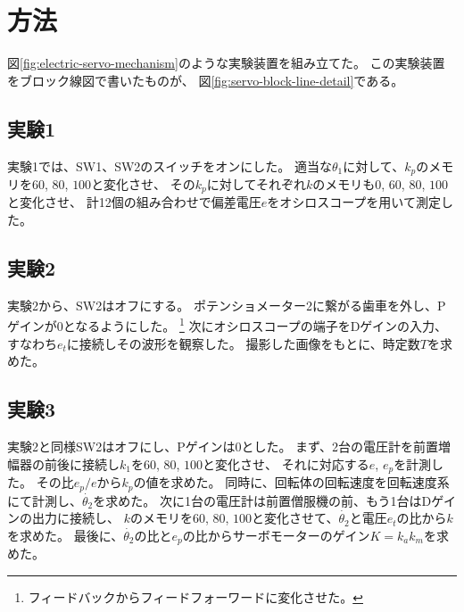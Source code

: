 \documentclass[../../../main]{subfiles}
\begin{document}
\section{方法}

図\ref{fig:electric-servo-mechanism}のような実験装置を組み立てた。
この実験装置をブロック線図で書いたものが、
図\ref{fig:servo-block-line-detail}である。

\subsection{実験1}
実験1では、SW1、SW2のスイッチをオンにした。
適当な$\theta_1$に対して、$k_p$のメモリを$60$, $80$, $100$と変化させ、
その$k_p$に対してそれぞれ$k$のメモリも$0$, $60$, $80$, $100$と変化させ、
計12個の組み合わせで偏差電圧$e$をオシロスコープを用いて測定した。

\subsection{実験2}
実験2から、SW2はオフにする。
ポテンショメーター2に繋がる歯車を外し、Pゲインが$0$となるようにした。
\footnote{
	フィードバックからフィードフォーワードに変化させた。
}
次にオシロスコープの端子をDゲインの入力、すなわち$e_t$に接続しその波形を観察した。
撮影した画像をもとに、時定数$T$を求めた。

\subsection{実験3}
実験2と同様SW2はオフにし、Pゲインは$0$とした。
まず、2台の電圧計を前置増幅器の前後に接続し$k_1$を$60$, $80$, $100$と変化させ、
それに対応する$e$, $e_p$を計測した。
その比$e_p/e$から$k_p$の値を求めた。
同時に、回転体の回転速度を回転速度系にて計測し、$\dot{\theta_2}$を求めた。
次に1台の電圧計は前置僧服機の前、もう1台はDゲインの出力に接続し、
$k$のメモリを$60$, $80$, $100$と変化させて、$\dot{\theta_2}$と電圧$e_t$の比から$k$を求めた。
最後に、$\dot{\theta_2}$の比と$e_p$の比からサーボモーターのゲイン$K=k_ak_m$を求めた。
\end{document}
